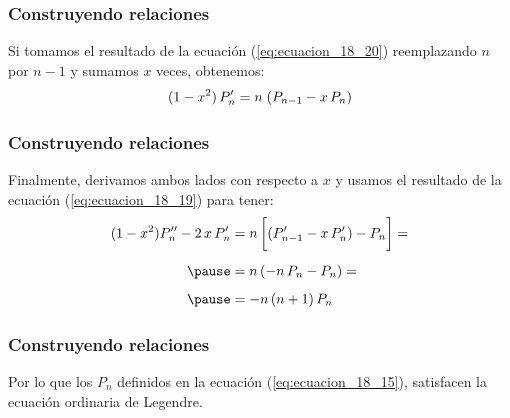 \documentclass[12pt]{beamer}
\begin{document}
\begin{frame}
\frametitle{Construyendo relaciones}
Si tomamos el resultado de la ecuación (\ref{eq:ecuacion_18_20}) reemplazando $n$ por $n-1$ y sumamos $x$ veces, obtenemos:
\pause
\begin{equation}
(1 - x^{2}) \, {P}^{\prime}_{n} = n \; (P_{n-1} - x \, P_{n})
\label{eq:ecuacion_18_21}
\end{equation}
\end{frame}
\begin{frame}
\frametitle{Construyendo relaciones}
Finalmente, derivamos ambos lados con respecto a $x$ y usamos el resultado de la ecuación (\ref{eq:ecuacion_18_19}) para tener:
\pause
\begin{eqnarray*}
\begin{aligned}
(1 - x^{2}) \sderivada{P}_{n} - 2 \, x \, \pderivada{P}_{n} &= n \, \bigg[ (\pderivada{P}_{n-1} - x \, \pderivada{P}_{n}) - P_{n} \bigg] = \\[0.5em] \pause
&= n \, (-n \, P_{n} - P_{n}) = \\[0.5em] \pause
&= -n \, (n + 1) \, P_{n}
\end{aligned}
\end{eqnarray*}
\end{frame}
\begin{frame}
\frametitle{Construyendo relaciones}
Por lo que los $P_{n}$ definidos en la ecuación (\ref{eq:ecuacion_18_15}), satisfacen la ecuación ordinaria de Legendre.
\end{frame}
\end{document}
